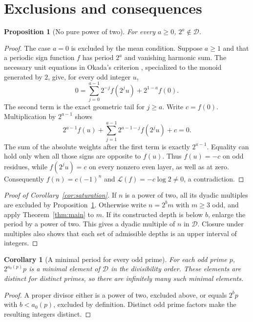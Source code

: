 \documentclass[11pt,a4paper]{article}
\newtheorem{proposition}[theorem]{Proposition}
\newtheorem{corollary}[theorem]{Corollary}
\theoremstyle{definition}\newtheorem{definition}[theorem]{Definition}
\theoremstyle{remark}\newtheorem{remark}[theorem]{Remark}
\newcommand{\Dset}{\mathcal D}\newcommand{\wt}{\operatorname{wt}}
\newcommand{\LL}{\mathcal L}\newcommand{\UU}{\mathcal U}
\begin{document}
\section{Exclusions and consequences}\label{sec:consequences}
\begin{proposition}[No pure power of two]\label{prop:pure}
For every $a\ge0$, $2^a\notin\Dset$.
\end{proposition}
\begin{proof}
The case $a=0$ is excluded by the mean condition. Suppose $a\ge1$
and that a periodic sign function $f$ has period $2^a$ and vanishing
harmonic sum. The necessary unit equations in Okada's criterion
\cite[Theorem 1.1]{MP2022}, specialized to the monoid generated by
$2$, give, for every odd integer $u$,
\[
 0=\sum_{j=0}^{a-1}2^{-j}f(2^ju)+2^{1-a}f(0).
\]
The second term is the exact geometric tail for $j\ge a$.
Write $c=f(0)$. Multiplication by $2^{a-1}$ shows
\[
 2^{a-1}f(u)+\sum_{j=1}^{a-1}2^{a-1-j}f(2^ju)+c=0.
\]
The sum of the absolute weights after the first term is exactly
$2^{a-1}$. Equality can hold only when all those signs are opposite
to $f(u)$. Thus $f(u)=-c$ on odd residues, while $f(2^ju)=c$
on every nonzero even layer, as well as at zero. Consequently
$f(n)=c(-1)^n$ and $\LL(f)=-c\log2\ne0$, a contradiction.
\end{proof}

\begin{proof}[Proof of Corollary~\ref{cor:saturation}]
If $n$ is a power of two, all its dyadic multiples are excluded by
Proposition~\ref{prop:pure}. Otherwise write $n=2^bm$ with $m\ge3$
odd, and apply Theorem~\ref{thm:main} to $m$. If its constructed
depth is below $b$, enlarge the period by a power of two. This gives
a dyadic multiple of $n$ in $\Dset$. Closure under multiples also
shows that each set of admissible depths is an upper interval of integers.
\end{proof}

\begin{corollary}[A minimal period for every odd prime]
For each odd prime $p$, $2^{a_0(p)}p$ is a minimal element of
$\Dset$ in the divisibility order. These elements are distinct for
distinct primes, so there are infinitely many such minimal elements.
\end{corollary}
\begin{proof}
A proper divisor either is a power of two, excluded above, or equals
$2^bp$ with $b<a_0(p)$, excluded by definition. Distinct odd prime
factors make the resulting integers distinct.
\end{proof}
\end{document}
